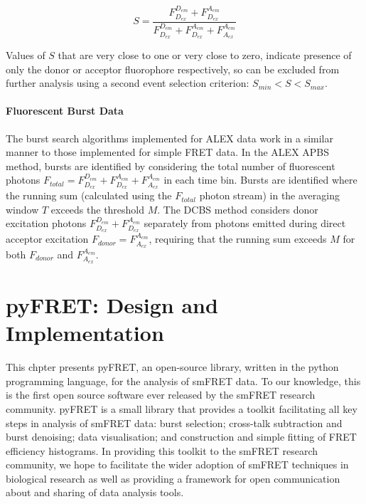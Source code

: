 \begin{equation}
S = \frac{F_{D_{ex}}^{D_{em}} + F_{D_{ex}}^{A_{em}}}{F_{D_{ex}}^{D_{em}} + F_{D_{ex}}^{A_{em}} + F_{A_{ex}}^{A_{em}}}
\label{eq:stoichiometry}
\end{equation}

Values of $S$  that are very close to one or very close to zero, indicate presence of only the donor or acceptor fluorophore respectively, so can be excluded from further analysis using a second event selection criterion: $S_{min} < S < S_{max}$. 

\paragraph{Fluorescent Burst Data}
The burst search algorithms implemented for ALEX data work in a similar manner to those implemented for simple FRET data. In the ALEX APBS method, bursts are identified by considering the total number of fluorescent photons $F_{total} = F_{D_{ex}}^{D_{em}} + F_{D_{ex}}^{A_{em}} + F_{A_{ex}}^{A_{em}}$ in each time bin. Bursts are identified where the running sum (calculated using the  $F_{total}$ photon stream) in the averaging window $T$ exceeds the threshold $M$. The DCBS method considers donor excitation photons $F_{D_{ex}}^{D_{em}} + F_{D_{ex}}^{A_{em}}$ separately from photons emitted during direct acceptor excitation $F_{donor} = F_{A_{ex}}^{A_{em}}$, requiring that the running sum exceeds $M$ for both $F_{donor}$ and $F_{A_{ex}}^{A_{em}}$.

\section{pyFRET: Design and Implementation}
This chpter presents pyFRET, an open-source library, written in the python programming language, for the analysis of smFRET data. To our knowledge, this is the first open source software ever released by the smFRET research community. pyFRET is a small library that provides a toolkit facilitating all key steps in analysis of smFRET data: burst selection; cross-talk subtraction and burst denoising; data visualisation; and construction and simple fitting of FRET efficiency histograms. In providing this toolkit to the smFRET research community, we hope to facilitate the wider adoption of smFRET techniques in biological research as well as providing a framework for open communication about and sharing of data analysis tools.

